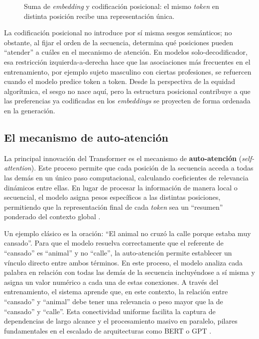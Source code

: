 \documentclass[12pt,a4paper]{report}
\begin{document}
\begin{figure}[H]
{%
    }
    \caption{Suma de \textit{embedding} y codificación posicional: el mismo \textit{token} en distinta posición recibe una representación única.}
    \label{fig:comparativa_posicion}
\end{figure}

La codificación posicional no introduce por sí misma sesgos semánticos; no obstante, al fijar el orden de la secuencia, determina qué posiciones pueden ``atender'' a cuáles en el mecanismo de atención. En modelos solo-decodificador, esa restricción izquierda-a-derecha hace que las asociaciones más frecuentes en el entrenamiento, por ejemplo sujeto masculino con ciertas profesiones, se refuercen cuando el modelo predice token a token. Desde la perspectiva de la equidad algorítmica, el sesgo no nace aquí, pero la estructura posicional contribuye a que las preferencias ya codificadas en los \textit{embeddings} se proyecten de forma ordenada en la generación.

\subsection{El mecanismo de auto-atención}
\label{subsec:mecanismo_atencion}

La principal innovación del Transformer es el mecanismo de \textbf{auto-atención} (\textit{self-attention}). Este proceso permite que cada posición de la secuencia acceda a todas las demás en un único paso computacional, calculando coeficientes de relevancia dinámicos entre ellas. En lugar de procesar la información de manera local o secuencial, el modelo asigna pesos específicos a las distintas posiciones, permitiendo que la representación final de cada \textit{token} sea un ``resumen'' ponderado del contexto global \cite{vaswani_attention_2017}.

Un ejemplo clásico es la oración: ``El animal no cruzó la calle porque estaba muy cansado''. Para que el modelo resuelva correctamente 
que el referente de ``cansado'' es ``animal'' y no ``calle'', la auto-atención permite establecer un vínculo directo entre ambos términos. 
En este proceso, el modelo analiza cada palabra en relación con todas las demás de la secuencia incluyéndose a sí misma y asigna un valor numérico a 
cada una de estas conexiones. A través del entrenamiento, el sistema aprende que, en este contexto, la relación entre ``cansado'' y ``animal'' 
debe tener una relevancia o peso mayor que la de ``cansado'' y ``calle''. Esta conectividad uniforme facilita la captura de dependencias de largo alcance 
y el procesamiento masivo en paralelo, pilares fundamentales en el escalado de arquitecturas como BERT o GPT \cite{devlin_bert_2018}.
\end{document}
